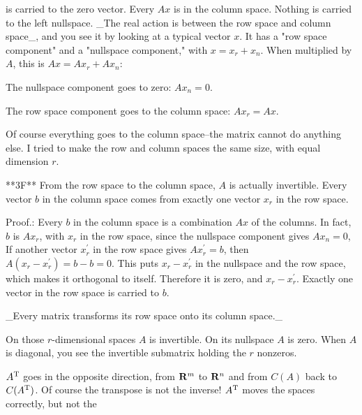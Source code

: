 is carried to the zero vector. Every \(Ax\) is in the column space. Nothing is carried to the left nullspace. _The real action is between the row space and column space_, and you see it by looking at a typical vector \(x\). It has a "row space component" and a "nullspace component," with \(x=x_{r}+x_{n}\). When multiplied by \(A\), this is \(Ax=Ax_{r}+Ax_{n}\):

The nullspace component goes to zero: \(Ax_{n}=0\).

The row space component goes to the column space: \(Ax_{r}=Ax\).

Of course everything goes to the column space--the matrix cannot do anything else. I tried to make the row and column spaces the same size, with equal dimension \(r\).

**3F** From the row space to the column space, \(A\) is actually invertible. Every vector \(b\) in the column space comes from exactly one vector \(x_{r}\) in the row space.

Proof.: Every \(b\) in the column space is a combination \(Ax\) of the columns. In fact, \(b\) is \(Ax_{r}\), with \(x_{r}\) in the row space, since the nullspace component gives \(Ax_{n}=0\), If another vector \(x_{r}^{\prime}\) in the row space gives \(Ax_{r}^{\prime}=b\), then \(A(x_{r}-x_{r}^{\prime})=b-b=0\). This puts \(x_{r}-x_{r}^{\prime}\) in the nullspace and the row space, which makes it orthogonal to itself. Therefore it is zero, and \(x_{r}-x_{r}^{\prime}\). Exactly one vector in the row space is carried to \(b\). 

_Every matrix transforms its row space onto its column space._

On those \(r\)-dimensional spaces \(A\) is invertible. On its nullspace \(A\) is zero. When \(A\) is diagonal, you see the invertible submatrix holding the \(r\) nonzeros.

\(A^{\rm T}\) goes in the opposite direction, from \({\bf R}^{m}\) to \({\bf R}^{n}\) and from \(C(A)\) back to \(C(A^{\rm T})\). Of course the transpose is not the inverse! \(A^{\rm T}\) moves the spaces correctly, but not the 